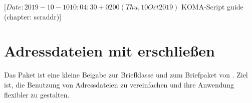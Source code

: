 %
%
%
%
%
%
%
%
% 
%
%
%
%

                 [$Date: 2019-10-10 10:04:30 +0200 (Thu, 10 Oct 2019) $
                  KOMA-Script guide (chapter: scraddr)]

\chapter{Adressdateien mit  erschließen}%
%
\BeginIndexGroup
{}

Das Paket  ist eine kleine Beigabe zur Briefklasse und zum
Briefpaket von \KOMAScript.  Ziel ist, die Benutzung von Adressdateien zu
vereinfachen und ihre Anwendung flexibler zu gestalten.

